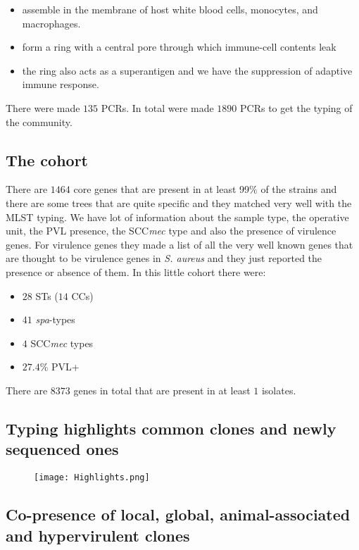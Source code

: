 \begin{itemize}
    \item assemble in the membrane of host white blood cells, monocytes, and macrophages. 
    \item form a ring with a central pore through which immune-cell contents leak
    \item the ring also acts as a superantigen and we have the suppression of adaptive immune response. 
\end{itemize}

There were made $135$ PCRs.
In total were made $1890$ PCRs to get the typing of the community. 

\subsection{The cohort}

There are $1464$ core genes that are present in at least 99$\%$ of the strains and there are some trees that are quite specific and they matched very well with the MLST typing. We have lot of information about the sample type, the operative unit, the PVL presence, the SCC\emph{mec} type and also the presence of virulence genes. For virulence genes they made a list of all the very well known genes that are thought to be virulence genes in \textit{S. aureus} and they just reported the presence or absence of them. In this little cohort there were:

\begin{itemize}
    \item $28$ STs ($14$ CCs)
    \item $41$ \emph{spa}-types
    \item $4$ SCC\emph{mec} types 
    \item $27.4\%$ PVL+
\end{itemize}

There are $8373$ genes in total that are present in at least $1$ isolates.
  
\subsection{Typing highlights common clones and newly sequenced ones}

\begin{figure}[h]
\centering
\texttt{[image: Highlights.png]}
\caption{}
\end{figure}

\subsection{Co-presence of local, global, animal-associated and hypervirulent clones}

